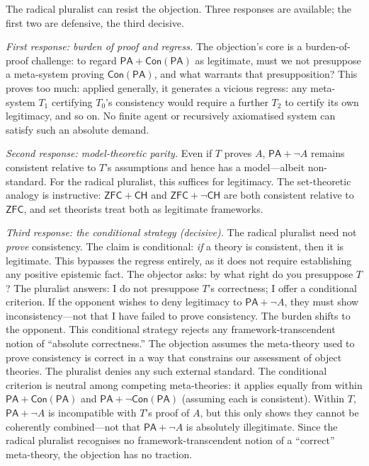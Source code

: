 \documentclass[a4paper,12pt]{amsart}
\theoremstyle{definition}
\numberwithin{equation}{section}
\begin{document}
The radical pluralist can resist the objection. Three responses are available; the first two are defensive, the third decisive.

\emph{First response: burden of proof and regress.} The objection's core is a burden-of-proof challenge: to regard $\mathsf{PA}+\mathsf{Con}(\mathsf{PA})$ as legitimate, must we not presuppose a meta-system proving \(\mathsf{Con}(\mathsf{PA})\), and what warrants that presupposition? This proves too much: applied generally, it generates a vicious regress: any meta-system $T_1$ certifying $T_0$'s 
consistency would require a further $T_2$ to certify its own 
legitimacy, and so on. No finite agent or recursively axiomatised system can satisfy such an absolute demand.
 
\emph{Second response: model-theoretic parity.} Even if \(T\) proves \(A\), \(\mathsf{PA} + \neg A\) remains consistent relative to \(T\)'s assumptions and hence has a model---albeit non-standard. For the radical pluralist, this suffices for legitimacy. The set-theoretic analogy is instructive: \(\mathsf{ZFC} + \mathsf{CH}\) and \(\mathsf{ZFC} + \neg \mathsf{CH}\) are both consistent relative to \(\mathsf{ZFC}\), and set theorists treat both as legitimate frameworks.

\emph{Third response: the conditional strategy (decisive).} The radical pluralist need not \emph{prove} consistency. The claim is conditional: \emph{if} a theory is consistent, then it is legitimate. This bypasses the regress entirely, as it does not require establishing any positive epistemic fact. The objector asks: by what right do you presuppose \(T\)? The pluralist answers: I do not presuppose \(T\)'s correctness; I offer a conditional criterion. If the opponent wishes to deny legitimacy to \(\mathsf{PA} + \neg A\), they must show inconsistency---not that I have failed to prove consistency.   The burden shifts to the opponent. This conditional strategy rejects any framework-transcendent notion of ``absolute correctness.'' The objection assumes the meta-theory used to prove consistency is correct in a way that constrains our assessment of object theories. The pluralist denies any such external standard. 
The conditional criterion is neutral among competing meta-theories: it applies equally from within $\mathsf{PA}+\mathsf{Con}(\mathsf{PA})$ and $\mathsf{PA}+\neg\mathsf{Con}(\mathsf{PA})$ (assuming each is consistent). Within \(T\), $\mathsf{PA}+\neg A$ is incompatible with \(T\)'s proof of \(A\), but this only shows they cannot be coherently combined---not that $\mathsf{PA}+\neg A$ is absolutely illegitimate. Since the radical pluralist recognises no framework-transcendent notion of a ``correct'' meta-theory, the objection has no traction.
\end{document}
